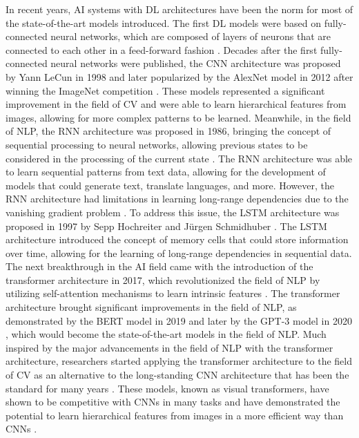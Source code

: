 \documentclass[english, 12pt, a4paper, elec, utf8, a-2b, online]{aaltothesis}
\begin{document}
In recent years, \ac{AI} systems with \ac{DL} architectures have been the norm for most of the state-of-the-art models introduced.
The first \ac{DL} models were based on fully-connected neural networks, which are composed of layers of neurons that are connected to each other in a feed-forward fashion \cite{Rosenblatt1958, Rosenblatt1961}.
Decades after the first fully-connected neural networks were published, the \ac{CNN} architecture was proposed by Yann LeCun in 1998 \cite{LeCun1998} and later popularized by the AlexNet model in 2012 after winning the ImageNet competition \cite{Krizhevsky2012}.
These models represented a significant improvement in the field of \ac{CV} and were able to learn hierarchical features from images, allowing for more complex patterns to be learned.
Meanwhile, in the field of \ac{NLP}, the \ac{RNN} architecture was proposed in 1986, bringing the concept of sequential processing to neural networks, allowing previous states to be considered in the processing of the current state \cite{Rumelhart1986}.
The \ac{RNN} architecture was able to learn sequential patterns from text data, allowing for the development of models that could generate text, translate languages, and more.
However, the \ac{RNN} architecture had limitations in learning long-range dependencies due to the vanishing gradient problem \cite{Hochreiter1991}.
To address this issue, the \ac{LSTM} architecture was proposed in 1997 by Sepp Hochreiter and Jürgen Schmidhuber \cite{Hochreiter1997}.
The \ac{LSTM} architecture introduced the concept of memory cells that could store information over time, allowing for the learning of long-range dependencies in sequential data.
The next breakthrough in the \ac{AI} field came with the introduction of the transformer architecture in 2017, which revolutionized the field of \ac{NLP} by utilizing self-attention mechanisms to learn intrinsic features \cite{Vaswani2017}.
The transformer architecture brought significant improvements in the field of \ac{NLP}, as demonstrated by the BERT model in 2019 \cite{Devlin2019} and later by the GPT-3 model in 2020 \cite{Brown2020}, which would become the state-of-the-art models in the field of \ac{NLP}.
Much inspired by the major advancements in the field of \ac{NLP} with the transformer architecture, researchers started applying the transformer architecture to the field of \ac{CV} as an alternative to the long-standing \ac{CNN} architecture that has been the standard for many years \cite{Chen2021}.
These models, known as visual transformers, have shown to be competitive with \ac{CNN}s in many tasks and have demonstrated the potential to learn hierarchical features from images in a more efficient way than \ac{CNN}s \cite{Dosovitskiy2021}.
\end{document}
